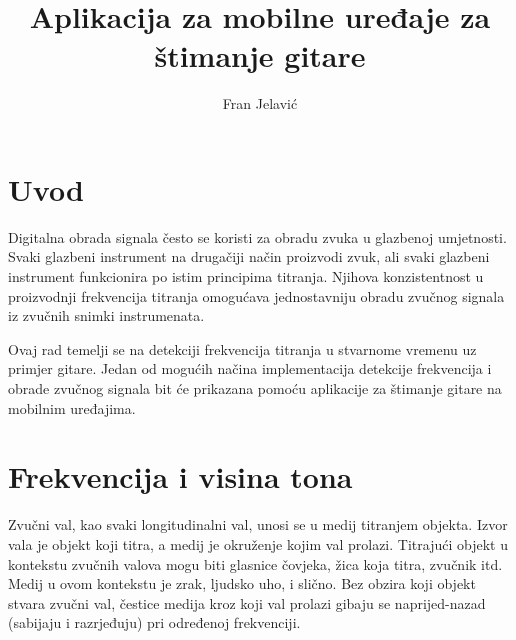 \documentclass[times, utf8, zavrsni, numeric]{fer}
\begin{document}

\title{Aplikacija za mobilne uređaje za štimanje gitare}

\author{Fran Jelavić}

\maketitle




\tableofcontents

\chapter{Uvod}
Digitalna obrada signala često se koristi za obradu zvuka u glazbenoj umjetnosti. Svaki glazbeni instrument na drugačiji način proizvodi zvuk, ali svaki glazbeni instrument funkcionira po istim principima titranja.
Njihova konzistentnost u proizvodnji frekvencija titranja omogućava jednostavniju obradu zvučnog signala iz zvučnih snimki instrumenata. 

Ovaj rad temelji se na detekciji frekvencija titranja u stvarnome vremenu uz primjer gitare. Jedan od mogućih načina implementacija detekcije frekvencija i obrade zvučnog signala bit će prikazana pomoću aplikacije za štimanje gitare na mobilnim uređajima.

%

\chapter{Frekvencija i visina tona}
Zvučni val, kao svaki longitudinalni val, unosi se u medij titranjem objekta. Izvor vala je objekt koji titra, a medij je okruženje kojim val prolazi. Titrajući objekt u kontekstu zvučnih valova mogu biti glasnice čovjeka, žica koja titra, zvučnik itd. Medij u ovom kontekstu je zrak, ljudsko uho, i slično. Bez obzira koji objekt stvara zvučni val, čestice medija kroz koji val prolazi gibaju se naprijed-nazad (sabijaju i razrjeđuju) pri određenoj frekvenciji.
\end{document}
